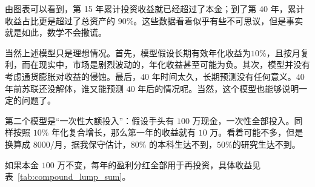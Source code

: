 \documentclass[12pt,openany]{book}
\begin{document}
由图表可以看到，第 15 年累计投资收益就已经超过了本金；到了第 40 年，累计收益占比更是超过了总资产的 $90\%$。这些数据看着似乎有些不可思议，但是事实就是如此，数学不会撒谎。

当然上述模型只是理想情况。首先，模型假设长期有效年化收益为$10\%$，且按月复利，而在现实中，市场是剧烈波动的，年化收益甚至可能为负。其次，模型并没有考虑通货膨胀对收益的侵蚀。最后，$40$ 年时间太久，长期预测没有任何意义。$40$ 年前苏联还没解体，谁又能预测 $40$ 年后的情况呢。当然，这个模型也能够说明一定的问题了。

第二个模型是“一次性大额投入”：假设手头有 $100$ 万现金，一次性全部投入。同样按照 $10\%$ 年化复合增长，那么第一年的收益就有 $10$ 万。看着可能不多，但是换算成 $8000$/月，据我保守估计，$80\%$ 的本科生达不到，$50\%$的研究生达不到。

如果本金 $100$ 万不变，每年的盈利分红全部用于再投资，具体收益见表~\ref{tab:compound_lump_sum}。
\end{document}
